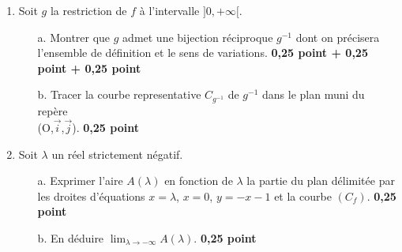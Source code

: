 \documentclass[12pt]{article}
\begin{document}
\begin{enumerate}
\item Soit $g$ la restriction de $f$ à l'intervalle $]0, +\infty[.$
\begin{enumerate}
\item[a.] Montrer que $g$ admet une bijection réciproque $g^{-1}$ dont on précisera l'ensemble de définition et le sens de variations. \textbf{ 0,25 point + 0,25 point + 0,25 point}
\item[b.] Tracer la courbe representative $C_{g^{-1}}$ de $g^{-1}$ dans le plan muni du repère \\
			(O,$\vec{i}$,$\vec{j}$). \textbf{ 0,25 point}
\end{enumerate}
\item Soit $\lambda$ un réel strictement négatif.
\begin{enumerate}
\item[a.] Exprimer l'aire $A(\lambda)$ en fonction de $\lambda$ la partie du plan délimitée par les droites d'équations $x=\lambda$, $x=0$, $y=-x-1$ et la courbe $(C_{f})$. \textbf{ 0,25 point}
\item[b.] En déduire $\lim_{\lambda \to -\infty}A(\lambda)$. \textbf{ 0,25 point}
\end{enumerate}
\end{enumerate}
\end{document}
